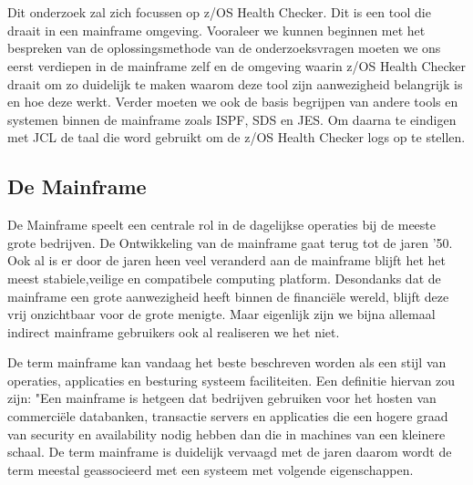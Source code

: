 \chapter{}
\label{ch:stand-van-zaken}



Dit onderzoek zal zich focussen op z/OS Health Checker. Dit is een tool die draait in een mainframe omgeving. Vooraleer we kunnen beginnen met het bespreken van de oplossingsmethode van de onderzoeksvragen moeten we ons eerst verdiepen in de mainframe zelf en de omgeving waarin z/OS Health Checker draait om zo duidelijk te maken waarom deze tool zijn aanwezigheid belangrijk is en hoe deze werkt. Verder moeten we ook de basis begrijpen van andere tools en systemen binnen de mainframe zoals ISPF, SDS en JES. Om daarna te eindigen met JCL de taal die word gebruikt om de z/OS Health Checker logs op te stellen.

\section{De Mainframe}
\label{sec:De Mainframe}

De Mainframe speelt een centrale rol in de dagelijkse operaties bij de meeste grote bedrijven. De Ontwikkeling van de mainframe gaat terug tot de jaren '50. Ook al is er door de jaren heen veel veranderd aan de mainframe blijft het het meest stabiele,veilige en compatibele computing platform. Desondanks dat de mainframe een grote aanwezigheid heeft binnen de financiële wereld, blijft deze vrij onzichtbaar voor de grote menigte. Maar eigenlijk zijn we bijna allemaal indirect mainframe gebruikers ook al realiseren we het niet. \cite{Ebbers2011}

De term mainframe kan vandaag het beste beschreven worden als een stijl van operaties, applicaties en besturing systeem faciliteiten. Een definitie hiervan zou zijn: "Een mainframe is hetgeen dat bedrijven gebruiken voor het hosten van commerciële databanken, transactie servers en applicaties die een hogere graad van security en availability nodig hebben dan die in machines van een kleinere schaal. 
De term mainframe is duidelijk vervaagd met de jaren daarom wordt de term meestal geassocieerd met een systeem met volgende eigenschappen. \cite{Ebbers2011}

